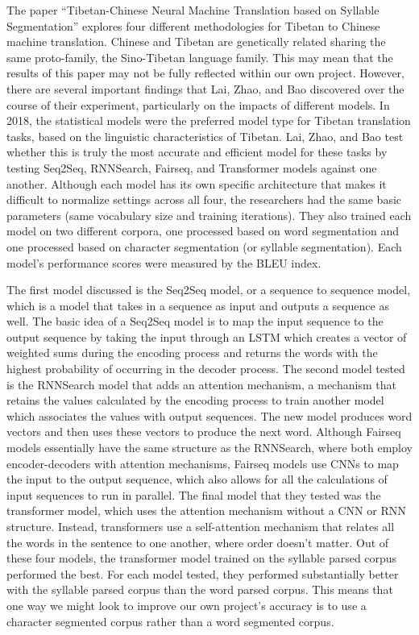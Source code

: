 \documentclass[letterpaper, 12 pt, conference]{ieeeconf}  %
\begin{document}
The paper “Tibetan-Chinese Neural Machine Translation based on Syllable Segmentation” explores four different methodologies for Tibetan to Chinese machine translation. Chinese and Tibetan are genetically related sharing the same proto-family, the Sino-Tibetan language family. This may mean that the results of this paper may not be fully reflected within our own project. However, there are several important findings that Lai, Zhao, and Bao discovered over the course of their experiment, particularly on the impacts of different models. In 2018, the statistical models were the preferred model type for Tibetan translation tasks, based on the linguistic characteristics of Tibetan. Lai, Zhao, and Bao test whether this is truly the most accurate and efficient model for these tasks by testing Seq2Seq, RNNSearch, Fairseq, and Transformer models against one another. Although each model has its own specific architecture that makes it difficult to normalize settings across all four, the researchers had the same basic parameters (same vocabulary size and training iterations). They also trained each model on two different corpora, one processed based on word segmentation and one processed based on character segmentation (or syllable segmentation). Each model’s performance scores were measured by the BLEU index.

The first model discussed is the Seq2Seq model, or a sequence to sequence model, which is a model that takes in a sequence as input and outputs a sequence as well. The basic idea of a Seq2Seq model is to map the input sequence to the output sequence by taking the input through an LSTM which creates a vector of weighted sums during  the encoding process and returns the words with the highest probability of occurring in the decoder process. The second model tested is the RNNSearch model that adds an attention mechanism, a mechanism that retains the values calculated by the encoding process to train another model which associates the values with output sequences. The new model produces word vectors and then uses these vectors to produce the next word. Although Fairseq models essentially have the same structure as the RNNSearch, where both employ encoder-decoders with attention mechanisms, Fairseq models use CNNs to map the input to the output sequence, which also allows for all the calculations of input sequences to run in parallel. The final model that they tested was the transformer model, which uses the attention mechanism without a CNN or RNN structure. Instead, transformers use a self-attention mechanism that relates all the words in the sentence to one another, where order doesn't matter. Out of these four models, the transformer model trained on the syllable parsed corpus performed the best. For each model tested, they performed substantially better with the syllable parsed corpus than the word parsed corpus. This means that one way we might look to improve our own project’s accuracy is to use a character segmented corpus rather than a word segmented corpus. 
\end{document}
